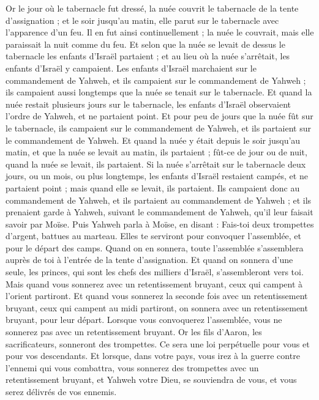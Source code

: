\begin{multicols}{2}
Or le jour où le tabernacle fut dressé, la nuée couvrit le tabernacle de la tente d'assignation ; et le soir jusqu'au matin, elle parut sur le tabernacle avec l'apparence d'un feu.
Il en fut ainsi continuellement ; la nuée le couvrait, mais elle paraissait la nuit comme du feu.
Et selon que la nuée se levait de dessus le tabernacle les enfants d'Israël partaient ; et au lieu où la nuée s'arrêtait, les enfants d'Israël y campaient.
Les enfants d'Israël marchaient sur le commandement de Yahweh, et ils campaient sur le commandement de Yahweh ; ils campaient aussi longtemps que la nuée se tenait sur le tabernacle.
Et quand la nuée restait plusieurs jours sur le tabernacle, les enfants d'Israël observaient l'ordre de Yahweh, et ne partaient point.
Et pour peu de jours que la nuée fût sur le tabernacle, ils campaient sur le commandement de Yahweh, et ils partaient sur le commandement de Yahweh.
Et quand la nuée y était depuis le soir jusqu'au matin, et que la nuée se levait au matin, ils partaient ; fût-ce de jour ou de nuit, quand la nuée se levait, ils partaient.
Si la nuée s'arrêtait sur le tabernacle deux jours, ou un mois, ou plus longtemps, les enfants d'Israël restaient campés, et ne partaient point ; mais quand elle se levait, ils partaient.
Ils campaient donc au commandement de Yahweh, et ils partaient au commandement de Yahweh ; et ils prenaient garde à Yahweh, suivant le commandement de Yahweh, qu'il leur faisait savoir par Moïse.
\VerseOne{}Puis Yahweh parla à Moïse, en disant :
Fais-toi deux trompettes d'argent, battues au marteau. Elles te serviront pour convoquer l'assemblée, et pour le départ des camps.
Quand on en sonnera, toute l'assemblée s'assemblera auprès de toi à l'entrée de la tente d'assignation.
Et quand on sonnera d'une seule, les princes, qui sont les chefs des milliers d'Israël, s'assembleront vers toi.
Mais quand vous sonnerez avec un retentissement bruyant, ceux qui campent à l'orient partiront.
Et quand vous sonnerez la seconde fois avec un retentissement bruyant, ceux qui campent au midi partiront, on sonnera avec un retentissement bruyant, pour leur départ.
Lorsque vous convoquerez l'assemblée, vous ne sonnerez pas avec un retentissement bruyant.
Or les fils d'Aaron, les sacrificateurs, sonneront des trompettes. Ce sera une loi perpétuelle pour vous et pour vos descendants.
Et lorsque, dans votre pays, vous irez à la guerre contre l'ennemi qui vous combattra, vous sonnerez des trompettes avec un retentissement bruyant, et Yahweh votre Dieu, se souviendra de vous, et vous serez délivrés de vos ennemis.

\end{multicols}
